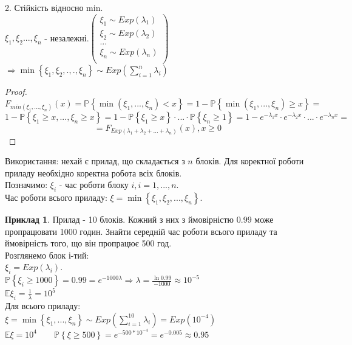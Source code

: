\documentclass[fontsize=14pt,a4paper]{scrartcl}
\theoremstyle{definition}
\newtheorem*{example}{Приклад}
\theoremstyle{remark}
\theoremstyle{definition}
\theoremstyle{definition}
\begin{document}
2. Стійкість відносно min.\\
$ \xi_1, \xi_2 ... , \xi_n$ - незалежні.$ \left(  \begin{gathered}
\xi_1 \sim Exp(\lambda_1) \\
 \xi_2 \sim Exp(\lambda_2) \\
 ...\\
 \xi_n \sim Exp(\lambda_n) \\
\end{gathered} \right) $  $ \Rightarrow \min \left\lbrace  \xi_1 , \xi_2, .,. , \xi_n \right\rbrace  \sim Exp (  \sum\limits_{i = 1}^{ n}{ \lambda_i})$
\begin{proof}

$$
F_{min(\xi_1, ..., \xi_n)} (x) = \mathbb{P} \left\lbrace \min \left(\xi_1, ... , \xi_n  \right) < x  \right\rbrace  = 1 - \mathbb{P} \left\lbrace \min \left(\xi_1, ... , \xi_n  \right) \geq  x  \right\rbrace =
$$
$$
1 - \mathbb{P} \left\lbrace  \xi_1 \geq x, ... , \xi_n \geq x \right\rbrace = 1 - \mathbb{P} \left\lbrace \xi_1 \geq  x \right\rbrace \cdot ... \cdot \mathbb{P} \left\lbrace   \xi_n \geq 1\right\rbrace = 1 - e ^ { - \lambda_1 x} \cdot e^ { -\lambda_2 x} \cdot ... \cdot e^{- \lambda_n x} =
$$
$$
 = F_{Exp(\lambda_1 + \lambda_2 + ... + \lambda_n)} (x), x\geq 0
$$

\end{proof}
Використання: нехай є прилад, що складається з $n$ блоків. Для коректної роботи приладу необхідно коректна робота всіх блоків. \\
Позначимо: $\xi_i$ - час роботи блоку $i, i = 1, ..., n$.\\
Час роботи всього приладу: $ \xi = \min \left\lbrace \xi_1, \xi_2, ..., \xi_n \right\rbrace $.
\begin{example}
	Прилад - 10 блоків. Кожний з них з ймовірністю 0.99 може пропрацювати 1000 годин. Знайти середній час роботи всього приладу та ймовірність того, що він пропрацює 500 год.\\
	Розглянемо блок і-тий: \\$ \xi_i = Exp(\lambda_i)$.\\
	$\mathbb{P} \left\lbrace \xi_i \geq 1000 \right\rbrace = 0.99 = e ^ {-1000 \lambda} \Longrightarrow \lambda = \frac{ \ln{0.99}}{-1000} \approx 10^{-5}$\\
	$\mathbb{E} \xi_i = \frac{1}{\lambda} = 10^5 $\\
	Для всього приладу:\\
	$ \xi = \min \left\lbrace \xi_1, ... , \xi_n \right\rbrace  \sim Exp( \sum\limits_{i = 1}^{ 10}{\lambda_i}) = Exp(10^{-4})$\\
	$ \mathbb{E}\xi = 10^4 \qquad \mathbb{P} \left\lbrace \xi \geq 500 \right\rbrace = e^{-500 * 10^{-4}} = e^{-0.005} \approx 0.95$
\end{example}
\end{document}
